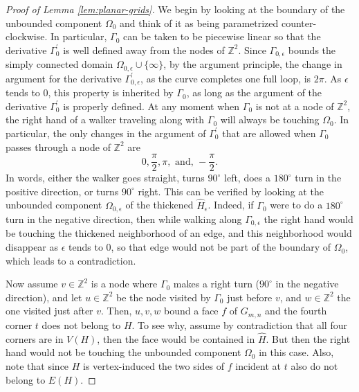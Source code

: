 \documentclass[10pt,a4paper]{amsart}
\newcommand{\Ga}{\Gamma }
\newcommand{\Om}{\Omega }
\newcommand{\Z}{\mathbb{Z}}
\newcommand{\ep}{\epsilon }
\begin{document}
\begin{proof}[Proof of Lemma \ref{lem:planar-grids}]
We begin by looking at the boundary of the unbounded component $\Om_0$ and think of it as being parametrized counter-clockwise. In particular, $\Ga_0$ can be taken to be piecewise linear so that the derivative $\Ga_0^\prime$ is well defined away from the nodes of $\Z^2$.
Since $\Ga_{0,\ep}$ bounds the simply connected domain $\Om_{0,\ep}\cup \{\infty\}$, by the argument principle, the change in argument for the derivative $\Ga_{0,\ep}^\prime$, as the curve completes one full loop, is $2\pi$. As $\ep$ tends to $0$, this property is inherited by $\Ga_0$, as long as the argument of the derivative $\Ga_0^\prime$ is properly defined.
At any moment when $\Ga_0$ is not at a node of $\Z^2$, the right hand of a walker traveling along with $\Ga_0$ will always be touching $\Om_0$. In particular, the only changes in the argument of $\Ga_0^\prime$ that are allowed when $\Ga_0$ passes through a node of $\Z^2$ are 
\[
0,\frac{\pi}{2},\pi,\text{ and, }-\frac{\pi}{2}.
\]
In words, either the walker goes straight, turns $90^\circ$ left, does a $180^\circ$ turn in the positive direction, or turns $90^\circ$ right. This can be verified by looking at the unbounded component $\Om_{0,\ep}$ of the thickened $\hat{H}_\ep$. Indeed, if $\Ga_0$ were to do a $180^\circ$ turn in the negative direction, then while walking along $\Ga_{0,\ep}$ the right hand would be touching the thickened neighborhood of an edge, and this neighborhood would disappear as $\ep$ tends to $0$, so that edge would not be part of the boundary of $\Om_0$, which leads to a contradiction. 

Now assume $v\in \Z^2$ is a node where $\Ga_0$ makes a right turn ($90^\circ$  in the negative direction), and let $u\in\Z^2$ be the node visited by $\Ga_0$ just before $v$, and $w\in\Z^2$ the one visited just after $v$.
Then, $u,v,w$ bound a face $f$ of $G_{m,n}$ and the fourth corner $t$ does not belong to $H$. To see why, assume by contradiction that all four corners are in $V(H)$, then the face would be contained in $\hat{H}$. But then the right hand would not be touching the unbounded component $\Om_0$ in this case.
Also, note that since $H$ is vertex-induced the two sides of $f$ incident at $t$ also do not belong to $E(H)$. 


\end{proof}
\end{document}
